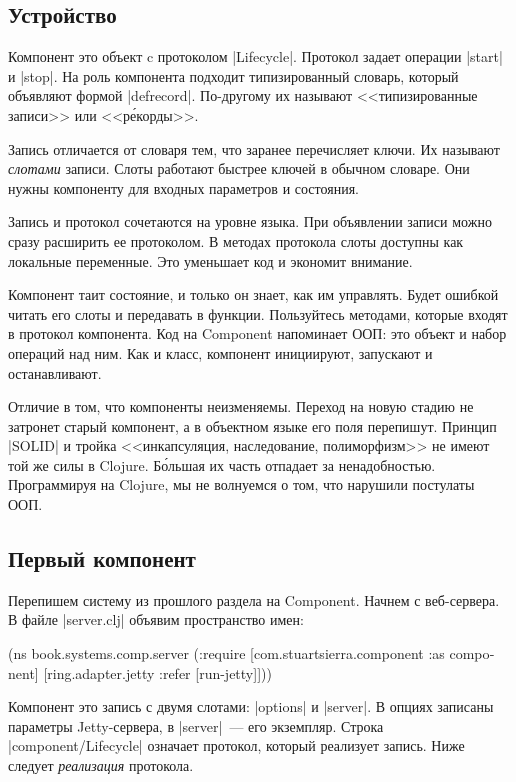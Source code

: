\subsection{Устройство}

Компонент это объект c протоколом \spverb|Lifecycle|. Протокол задает операции
\spverb|start| и \spverb|stop|. На роль компонента подходит типизированный
словарь, который объявляют формой \spverb|defrecord|. По-другому их называют
<<типизированные записи>> или <<р\'{е}корды>>.

Запись отличается от словаря тем, что заранее перечисляет ключи. Их называют
\emph{слотами} записи. Слоты работают быстрее ключей в обычном словаре. Они
нужны компоненту для входных параметров и состояния.

Запись и протокол сочетаются на уровне языка. При объявлении записи можно сразу
расширить ее протоколом. В методах протокола слоты доступны как локальные
переменные. Это уменьшает код и экономит внимание.

Компонент таит состояние, и только он знает, как им управлять. Будет ошибкой
читать его слоты и передавать в функции. Пользуйтесь методами, которые входят в
протокол компонента. Код на Component напоминает ООП: это объект и набор
операций над ним. Как и класс, компонент инициируют, запускают и останавливают.

Отличие в том, что компоненты неизменяемы. Переход на новую стадию не затронет
старый компонент, а в объектном языке его поля перепишут. Принцип \spverb|SOLID|
и тройка <<инкапсуляция, наследование, полиморфизм>> не имеют той же силы в
Clojure. Б\'{о}льшая их часть отпадает за ненадобностью. Программируя на
Clojure, мы не волнуемся о том, что нарушили постулаты ООП.

\subsection{Первый компонент}

Перепишем систему из прошлого раздела на Component. Начнем с веб-сервера. В
файле \spverb|server.clj| объявим пространство имен:

\begin{english}
  \begin{clojure}
(ns book.systems.comp.server
  (:require
   [com.stuartsierra.component :as component]
   [ring.adapter.jetty :refer [run-jetty]]))
  \end{clojure}
\end{english}

Компонент это запись с двумя слотами: \spverb|options| и \spverb|server|. В
опциях записаны параметры Jetty-сервера, в \spverb|server|~--- его
экземпляр. Строка \spverb|component/Lifecycle| означает протокол, который
реализует запись. Ниже следует \emph{реализация} протокола.

